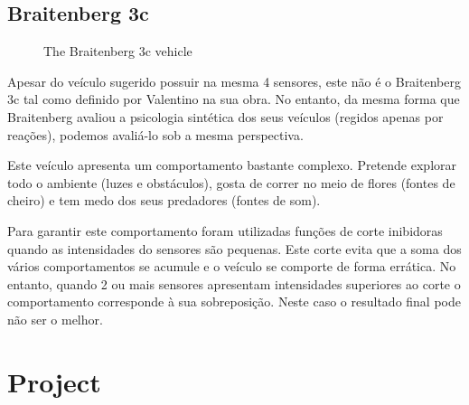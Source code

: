\documentclass[a4paper]{article}
\begin{document}
\subsection{Braitenberg 3c}
\begin{figure}[h]
	\centering
	
	\caption{The Braitenberg 3c vehicle}
\end{figure}
Apesar do veículo sugerido possuir na mesma 4 sensores, este não é o Braitenberg 3c tal como definido por Valentino na sua obra.
No entanto, da mesma forma que Braitenberg avaliou a psicologia sintética dos seus veículos (regidos apenas por reações),
podemos avaliá-lo sob a mesma perspectiva.

Este veículo apresenta um comportamento bastante complexo. Pretende explorar todo o ambiente (luzes e obstáculos), gosta de 
correr no meio de flores (fontes de cheiro) e tem medo dos seus predadores (fontes de som). 

Para garantir este comportamento foram utilizadas funções de corte inibidoras quando as intensidades do sensores são pequenas.
Este corte evita que a soma dos vários comportamentos se acumule e o veículo se comporte de forma errática.
No entanto, quando 2 ou mais sensores apresentam intensidades superiores ao corte o comportamento corresponde à sua sobreposição.
Neste caso o resultado final pode não ser o melhor.


\cleardoublepage
\section{Project}
\end{document}
